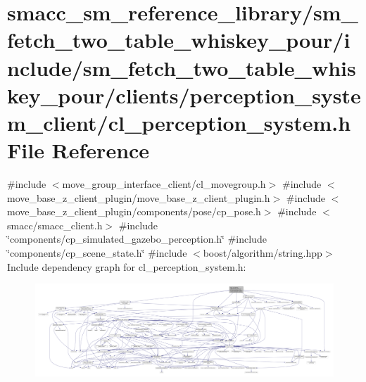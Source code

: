 \hypertarget{sm__fetch__two__table__whiskey__pour_2include_2sm__fetch__two__table__whiskey__pour_2clients_2pe3c1fd65b94a4ced08d60bd85111dc4ee}{}\section{smacc\+\_\+sm\+\_\+reference\+\_\+library/sm\+\_\+fetch\+\_\+two\+\_\+table\+\_\+whiskey\+\_\+pour/include/sm\+\_\+fetch\+\_\+two\+\_\+table\+\_\+whiskey\+\_\+pour/clients/perception\+\_\+system\+\_\+client/cl\+\_\+perception\+\_\+system.h File Reference}
\label{sm__fetch__two__table__whiskey__pour_2include_2sm__fetch__two__table__whiskey__pour_2clients_2pe3c1fd65b94a4ced08d60bd85111dc4ee}
{\ttfamily \#include $<$move\+\_\+group\+\_\+interface\+\_\+client/cl\+\_\+movegroup.\+h$>$}\newline
{\ttfamily \#include $<$move\+\_\+base\+\_\+z\+\_\+client\+\_\+plugin/move\+\_\+base\+\_\+z\+\_\+client\+\_\+plugin.\+h$>$}\newline
{\ttfamily \#include $<$move\+\_\+base\+\_\+z\+\_\+client\+\_\+plugin/components/pose/cp\+\_\+pose.\+h$>$}\newline
{\ttfamily \#include $<$smacc/smacc\+\_\+client.\+h$>$}\newline
{\ttfamily \#include \char`\"{}components/cp\+\_\+simulated\+\_\+gazebo\+\_\+perception.\+h\char`\"{}}\newline
{\ttfamily \#include \char`\"{}components/cp\+\_\+scene\+\_\+state.\+h\char`\"{}}\newline
{\ttfamily \#include $<$boost/algorithm/string.\+hpp$>$}\newline
Include dependency graph for cl\+\_\+perception\+\_\+system.\+h\+:
\nopagebreak
\begin{figure}[H]
\begin{center}
\leavevmode
\includegraphics[width=350pt]{sm__fetch__two__table__whiskey__pour_2include_2sm__fetch__two__table__whiskey__pour_2clients_2pe6e735d42abd4493950d9c8e4522ae8c3}
\end{center}
\end{figure}
